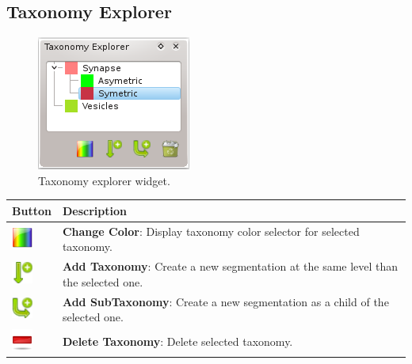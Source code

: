 \subsection{Taxonomy Explorer}

\begin{figure}[H]
\centering
\includegraphics{fig/TaxonomyExplorer}
\caption{Taxonomy explorer widget.}
\end{figure}

\begin{tabular}{| m{1.3cm} | m{12cm} |}
\hline
\textbf{Button} & \textbf{Description}\\
\hline
\includegraphics[width=0.7cm]{../../frontend/rsc/rainbow} &
\textbf{Change Color}: Display taxonomy color selector for selected taxonomy.\\
\hline
\includegraphics[width=0.7cm]{../../frontend/rsc/create_node} &
\textbf{Add Taxonomy}: Create a new segmentation at the same level than the
selected one.\\
\hline
\includegraphics[width=0.7cm]{../../frontend/rsc/create_subnode} &
\textbf{Add SubTaxonomy}: Create a new segmentation as a child of the selected
one.\\
\hline
\includegraphics[width=0.7cm]{../../frontend/rsc/remove} &
\textbf{Delete Taxonomy}: Delete selected taxonomy.\\
\hline
\end{tabular}
\vspace{0.3cm}

